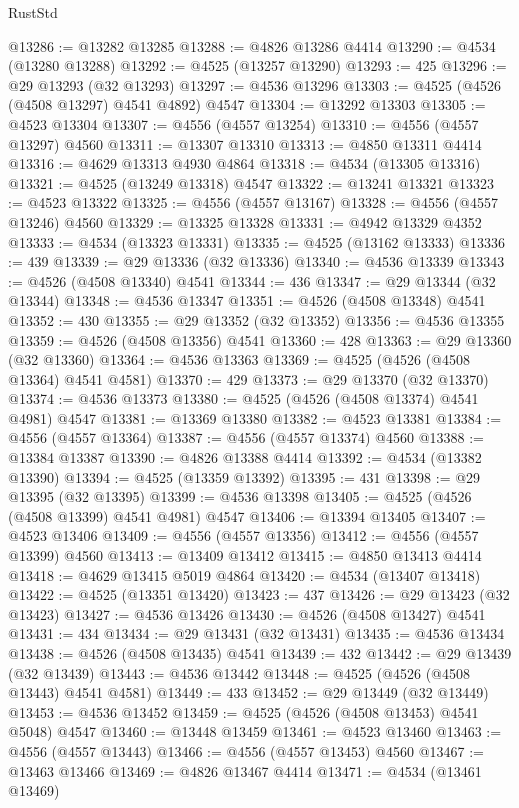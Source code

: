 \begin{lexlean}{RustStd}
\begin{coremodule}
{\begin{coremodule}
{{{{{{{{{{{{{{{{{{{{{{{{{{{{{{{{{{{{{{{{{{{{{{{{{{{{{{{@13286 := @13282 @13285
@13288 := @4826 @13286 @4414
@13290 := @4534 (@13280 @13288)
@13292 := @4525 (@13257 @13290)
@13293 := 425
@13296 := @29 @13293 (@32 @13293)
@13297 := @4536 @13296
@13303 := @4525 (@4526 (@4508 @13297) @4541 @4892) @4547
@13304 := @13292 @13303
@13305 := @4523 @13304
@13307 := @4556 (@4557 @13254)
@13310 := @4556 (@4557 @13297) @4560
@13311 := @13307 @13310
@13313 := @4850 @13311 @4414
@13316 := @4629 @13313 @4930 @4864
@13318 := @4534 (@13305 @13316)
@13321 := @4525 (@13249 @13318) @4547
@13322 := @13241 @13321
@13323 := @4523 @13322
@13325 := @4556 (@4557 @13167)
@13328 := @4556 (@4557 @13246) @4560
@13329 := @13325 @13328
@13331 := @4942 @13329 @4352
@13333 := @4534 (@13323 @13331)
@13335 := @4525 (@13162 @13333)
@13336 := 439
@13339 := @29 @13336 (@32 @13336)
@13340 := @4536 @13339
@13343 := @4526 (@4508 @13340) @4541
@13344 := 436
@13347 := @29 @13344 (@32 @13344)
@13348 := @4536 @13347
@13351 := @4526 (@4508 @13348) @4541
@13352 := 430
@13355 := @29 @13352 (@32 @13352)
@13356 := @4536 @13355
@13359 := @4526 (@4508 @13356) @4541
@13360 := 428
@13363 := @29 @13360 (@32 @13360)
@13364 := @4536 @13363
@13369 := @4525 (@4526 (@4508 @13364) @4541 @4581)
@13370 := 429
@13373 := @29 @13370 (@32 @13370)
@13374 := @4536 @13373
@13380 := @4525 (@4526 (@4508 @13374) @4541 @4981) @4547
@13381 := @13369 @13380
@13382 := @4523 @13381
@13384 := @4556 (@4557 @13364)
@13387 := @4556 (@4557 @13374) @4560
@13388 := @13384 @13387
@13390 := @4826 @13388 @4414
@13392 := @4534 (@13382 @13390)
@13394 := @4525 (@13359 @13392)
@13395 := 431
@13398 := @29 @13395 (@32 @13395)
@13399 := @4536 @13398
@13405 := @4525 (@4526 (@4508 @13399) @4541 @4981) @4547
@13406 := @13394 @13405
@13407 := @4523 @13406
@13409 := @4556 (@4557 @13356)
@13412 := @4556 (@4557 @13399) @4560
@13413 := @13409 @13412
@13415 := @4850 @13413 @4414
@13418 := @4629 @13415 @5019 @4864
@13420 := @4534 (@13407 @13418)
@13422 := @4525 (@13351 @13420)
@13423 := 437
@13426 := @29 @13423 (@32 @13423)
@13427 := @4536 @13426
@13430 := @4526 (@4508 @13427) @4541
@13431 := 434
@13434 := @29 @13431 (@32 @13431)
@13435 := @4536 @13434
@13438 := @4526 (@4508 @13435) @4541
@13439 := 432
@13442 := @29 @13439 (@32 @13439)
@13443 := @4536 @13442
@13448 := @4525 (@4526 (@4508 @13443) @4541 @4581)
@13449 := 433
@13452 := @29 @13449 (@32 @13449)
@13453 := @4536 @13452
@13459 := @4525 (@4526 (@4508 @13453) @4541 @5048) @4547
@13460 := @13448 @13459
@13461 := @4523 @13460
@13463 := @4556 (@4557 @13443)
@13466 := @4556 (@4557 @13453) @4560
@13467 := @13463 @13466
@13469 := @4826 @13467 @4414
@13471 := @4534 (@13461 @13469)
}}}}}}}}}}}}}}}}}}}}}}}}}}}}}}}}}}}}}}}}}}}}}}}}}}}}}}}
\end{coremodule}}
\end{coremodule}
\end{lexlean}
